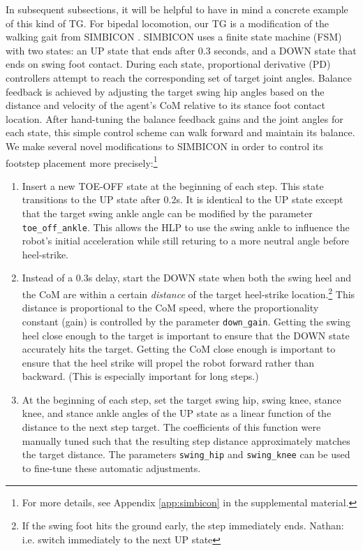 \documentclass[conference]{IEEEtran}
\newcommand{\nhatch}[1]{{\leavevmode\color{magenta} Nathan: #1}}
\begin{document}
In subsequent subsections, it will be helpful to have in mind a concrete example of this kind of TG.
For bipedal locomotion, our TG is a modification of the walking gait from SIMBICON \citep{yin2007simbicon}.
SIMBICON uses a finite state machine (FSM) with two states: an UP state that ends after 0.3 seconds, and a DOWN state that ends on swing foot contact.
During each state, proportional derivative (PD) controllers attempt to reach the corresponding set of target joint angles.
Balance feedback is achieved by adjusting the target swing hip angles based on the distance and velocity of the agent's CoM relative to its stance foot contact location.
After hand-tuning the balance feedback gains and the joint angles for each state, this simple control scheme can walk forward and maintain its balance.
We make several novel modifications to SIMBICON in order to control its footstep placement more precisely:\footnote{
For more details, see Appendix \ref{app:simbicon} in the supplemental material.}
\begin{enumerate}
  \item Insert a new TOE-OFF state at the beginning of each step.
    This state transitions to the UP state after 0.2s.
    It is identical to the UP state except that the target swing ankle angle can be modified by the parameter \texttt{toe\_off\_ankle}.
    This allows the HLP to use the swing ankle to influence the robot's initial acceleration while still returing to a more neutral angle before heel-strike.

  \item Instead of a 0.3s delay, start the DOWN state when both the swing heel and the CoM are within a certain \emph{distance} of the target heel-strike location.\footnote{
    If the swing foot hits the ground early, the step immediately ends.\nhatch{i.e. switch immediately to the next UP state}}
    This distance is proportional to the CoM speed, where the proportionality constant (gain) is controlled by the parameter \texttt{down\_gain}.
    Getting the swing heel close enough to the target is important to ensure that the DOWN state accurately hits the target.
    Getting the CoM close enough is important to ensure that the heel strike will propel the robot forward rather than backward.
    (This is especially important for long steps.)

  \item At the beginning of each step, set the target swing hip, swing knee, stance knee, and stance ankle angles of the UP state as a linear function of the distance to the next step target.
    The coefficients of this function were manually tuned such that the resulting step distance approximately matches the target distance.
    The parameters \texttt{swing\_hip} and \texttt{swing\_knee} can be used to fine-tune these automatic adjustments.
\end{enumerate}
\end{document}
